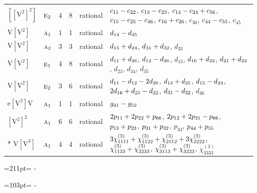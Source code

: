 \documentclass[10pt,a4paper]{article}
\newcommand{\needspace}[1]{\par\penalty-100\begingroup\dimen0=#1\relax\dimen2=\pagegoal
  \advance\dimen2-\pagetotal\ifdim\dimen0>\dimen2\relax\ifdim\dimen2>0pt\vfil\break\fi\fi
  \endgroup}
\numberwithin{equation}{section}
\newcommand{\irr}[1]{\text{\normalfont\scshape #1}}
\newcommand{\jahn}[1]{\mathrm{#1}}
\newlength{\fillwidth}\newlength{\cellwidth}\newlength{\colwidth}
\newcommand{\signbreak}{\penalty100\relax}
\begin{document}
{\begin{longtable}{@{}llrrl>{\RaggedRight\arraybackslash}p{\fillwidth}@{}}
$\jahn{[[V^{2}]^{2}]}$ & $\irr{e}_{2}$ & 4 & 8 & rational & $c_{11} -\signbreak c_{22}$, $c_{13} -\signbreak c_{23}$, $c_{14} -\signbreak c_{24} +\signbreak c_{56}$, $c_{15} -\signbreak c_{25} -\signbreak c_{46}$, $c_{16} +\signbreak c_{26}$, $c_{36}$, $c_{44} -\signbreak c_{55}$, $c_{45}$\\
$\jahn{V[V^{2}]}$ & $\irr{a}_{1}$ & 1 & 1 & rational & $d_{14} -\signbreak d_{25}$\\
$\jahn{V[V^{2}]}$ & $\irr{a}_{2}$ & 3 & 3 & rational & $d_{15} +\signbreak d_{24}$, $d_{31} +\signbreak d_{32}$, $d_{33}$\\
$\jahn{V[V^{2}]}$ & $\irr{e}_{1}$ & 4 & 8 & rational & $d_{11} +\signbreak d_{26}$, $d_{12} -\signbreak d_{26}$, $d_{13}$, $d_{16} +\signbreak d_{22}$, $d_{21} +\signbreak d_{22}$, $d_{23}$, $d_{34}$, $d_{35}$\\
$\jahn{V[V^{2}]}$ & $\irr{e}_{2}$ & 3 & 6 & rational & $d_{11} -\signbreak d_{12} -\signbreak 2d_{26}$, $d_{14} +\signbreak d_{25}$, $d_{15} -\signbreak d_{24}$, $2d_{16} +\signbreak d_{21} -\signbreak d_{22}$, $d_{31} -\signbreak d_{32}$, $d_{36}$\\
$\jahn{e[V^{2}]V}$ & $\irr{a}_{1}$ & 1 & 1 & rational & $\mathnormal{g}_{41} -\signbreak \mathnormal{g}_{52}$\\
$\jahn{[V^{2}]^{2}}$ & $\irr{a}_{1}$ & 6 & 6 & rational & $2p_{11} +\signbreak 2p_{22} +\signbreak p_{66}$, $2p_{12} +\signbreak 2p_{21} -\signbreak p_{66}$, $p_{13} +\signbreak p_{23}$, $p_{31} +\signbreak p_{32}$, $p_{33}$, $p_{44} +\signbreak p_{55}$\\*
$\jahn{V[V^{3}]}$ & $\irr{a}_{1}$ & 4 & 4 & rational & $3\chi^{(3)}_{1111} +\signbreak \chi^{(3)}_{1122} +\signbreak \chi^{(3)}_{2112} +\signbreak 3\chi^{(3)}_{2222}$, $\chi^{(3)}_{1133} +\signbreak \chi^{(3)}_{2233}$, $\chi^{(3)}_{3113} +\signbreak \chi^{(3)}_{3223}$, $\chi^{(3)}_{3333}$\\
\bottomrule\end{longtable}}
\needspace{211pt}
\needspace{103pt}
\end{document}
